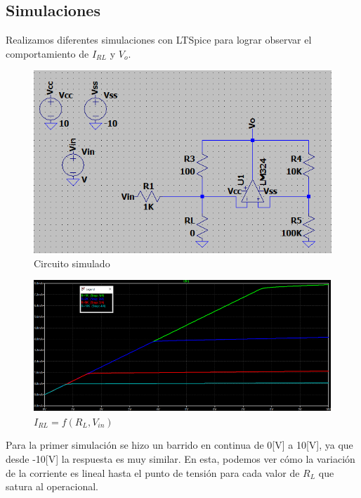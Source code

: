 \documentclass[11pt, a4paper]{article}
\begin{document}
\subsection{Simulaciones}
Realizamos diferentes simulaciones con LTSpice para lograr observar el comportamiento de $I_{RL}$ y $V_o$. 
\begin{figure}[H]
	\centering
	\includegraphics[width=1\textwidth]{Imagenes/Sim3.png}
	\caption{Circuito simulado}
\end{figure}
\begin{figure}[H]
	\centering
	\includegraphics[width=1\textwidth]{Imagenes/IlvsVin.png}
    \caption{$I_{RL} = f(R_L , V_{in})$}
\end{figure}
Para la primer simulación se hizo un barrido en continua de 0[V] a 10[V], ya que desde -10[V] la respuesta es muy similar. En esta, podemos ver cómo la variación de la corriente es lineal hasta el punto de tensión para cada valor de $R_L$  que satura al operacional. 
\end{document}
